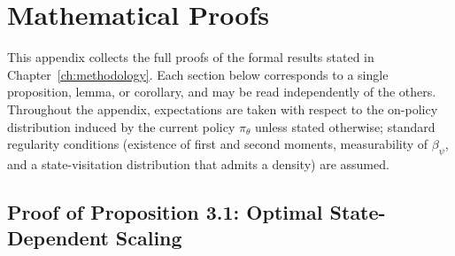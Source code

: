\chapter{Mathematical Proofs}
\label{app:proofs}

This appendix collects the full proofs of the formal results stated in Chapter~\ref{ch:methodology}. Each section below corresponds to a single proposition, lemma, or corollary, and may be read independently of the others. Throughout the appendix, expectations are taken with respect to the on-policy distribution induced by the current policy $\pi_\theta$ unless stated otherwise; standard regularity conditions (existence of first and second moments, measurability of $\beta_\psi$, and a state-visitation distribution that admits a density) are assumed.

\section{Proof of Proposition 3.1: Optimal State-Dependent Scaling}
\label{app:proof_target}

